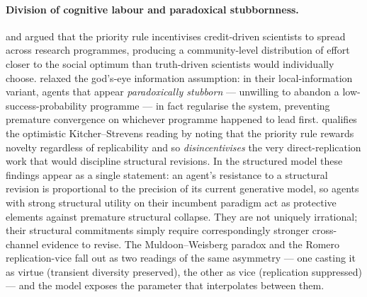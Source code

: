 \paragraph{Division of cognitive labour and paradoxical stubbornness.}
\citet{kitcher1990DivisionCognitiveLabor} and
\citet{strevens2003PriorityRule} argued that the priority rule
incentivises credit-driven scientists to spread across research
programmes, producing a community-level distribution of effort closer
to the social optimum than truth-driven scientists would individually
choose. \citet{muldoonWeisberg2011Robustness} relaxed the
god's-eye information assumption: in their local-information variant,
agents that appear \emph{paradoxically stubborn} --- unwilling to
abandon a low-success-probability programme --- in fact regularise
the system, preventing premature convergence on whichever programme
happened to lead first. \citet{romero2017NoveltyReplicability}
qualifies the optimistic Kitcher--Strevens reading by noting that the
priority rule rewards novelty regardless of replicability and so
\emph{disincentivises} the very direct-replication work that would
discipline structural revisions. In the structured model these
findings appear as a single statement: an agent's resistance to a
structural revision is proportional to the precision of its current
generative model, so agents with strong structural utility on their
incumbent paradigm act as protective elements against premature
structural collapse. They are not uniquely irrational; their
structural commitments simply require correspondingly stronger
cross-channel evidence to revise. The Muldoon--Weisberg paradox and
the Romero replication-vice fall out as two readings of the same
asymmetry --- one casting it as virtue (transient diversity
preserved), the other as vice (replication suppressed) --- and the
model exposes the parameter that interpolates between them.

